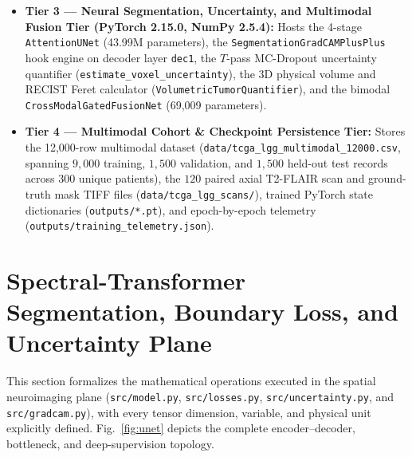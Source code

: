 \documentclass[journal,onecolumn,10pt]{IEEEtran}
\begin{document}
\begin{itemize}
    \item \textbf{Tier 3 --- Neural Segmentation, Uncertainty, and Multimodal Fusion Tier (PyTorch 2.15.0, NumPy 2.5.4):} Hosts the 4-stage \texttt{AttentionUNet} (43.99M parameters), the \texttt{SegmentationGradCAMPlusPlus} hook engine on decoder layer \texttt{dec1}, the $T$-pass MC-Dropout uncertainty quantifier (\texttt{estimate\_voxel\_uncertainty}), the 3D physical volume and RECIST Feret calculator (\texttt{VolumetricTumorQuantifier}), and the bimodal \texttt{CrossModalGatedFusionNet} (69,009 parameters).
    \item \textbf{Tier 4 --- Multimodal Cohort \& Checkpoint Persistence Tier:} Stores the 12,000-row multimodal dataset (\texttt{data/tcga\_lgg\_multimodal\_12000.csv}, spanning $9,000$ training, $1,500$ validation, and $1,500$ held-out test records across $300$ unique patients), the $120$ paired axial T2-FLAIR scan and ground-truth mask TIFF files (\texttt{data/tcga\_lgg\_scans/}), trained PyTorch state dictionaries (\texttt{outputs/*.pt}), and epoch-by-epoch telemetry (\texttt{outputs/training\_telemetry.json}).
\end{itemize}

\section{Spectral-Transformer Segmentation, Boundary Loss, and Uncertainty Plane}
This section formalizes the mathematical operations executed in the spatial neuroimaging plane (\texttt{src/model.py}, \texttt{src/losses.py}, \texttt{src/uncertainty.py}, and \texttt{src/gradcam.py}), with every tensor dimension, variable, and physical unit explicitly defined. Fig.~\ref{fig:unet} depicts the complete encoder--decoder, bottleneck, and deep-supervision topology.
\end{document}
